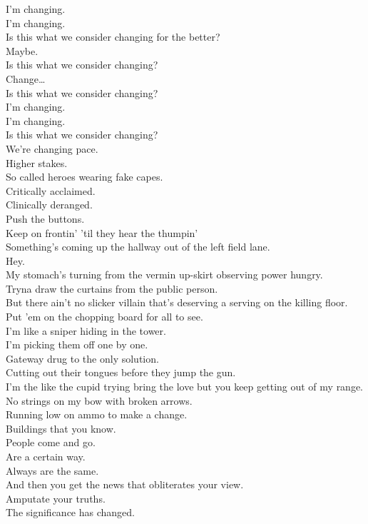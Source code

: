 I'm changing. \\
I'm changing. \\
Is this what we consider changing for the better? \\
Maybe. \\
Is this what we consider changing? \\
Change… \\

Is this what we consider changing? \\
I'm changing. \\
I'm changing. \\
Is this what we consider changing? \\

We're changing pace. \\
Higher stakes. \\
So called heroes wearing fake capes. \\
Critically acclaimed. \\
Clinically deranged. \\
Push the buttons. \\
Keep on frontin' 'til they hear the thumpin' \\
Something's coming up the hallway out of the left field lane. \\
Hey. \\
My stomach's turning from the vermin up-skirt observing power hungry. \\
Tryna draw the curtains from the public person. \\
But there ain't no slicker villain that's deserving a serving on the killing floor. \\
Put 'em on the chopping board for all to see. \\

I'm like a sniper hiding in the tower. \\
I'm picking them off one by one. \\
Gateway drug to the only solution. \\
Cutting out their tongues before they jump the gun. \\
I'm the like the cupid trying bring the love but you keep getting out of my range. \\
No strings on my bow with broken arrows. \\
Running low on ammo to make a change. \\

Buildings that you know. \\
People come and go. \\
Are a certain way. \\
Always are the same. \\
And then you get the news that obliterates your view. \\
Amputate your truths. \\
The significance has changed. \\

